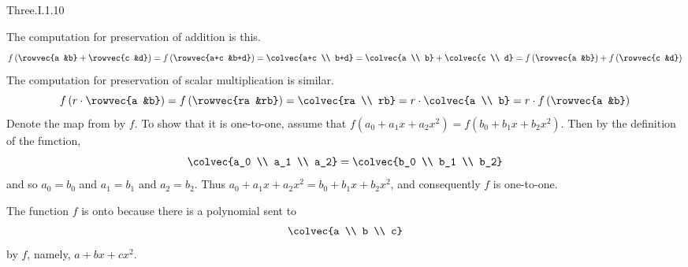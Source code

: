 \begin{ans}{Three.I.1.10}
\begin{exparts}
       The computation for preservation of addition is this.
       \begin{equation*}
         f\left(\rowvec{a &b}+\rowvec{c &d}\right)
           = f\left(\rowvec{a+c &b+d}\right)
           = \colvec{a+c \\ b+d}
           = \colvec{a \\ b}+\colvec{c \\ d}
           = f\left(\rowvec{a &b}\right)+f\left(\rowvec{c &d}\right)
       \end{equation*}
       The computation for preservation of scalar multiplication is similar.
       \begin{equation*}
         f\left(r\cdot\rowvec{a &b}\right)
           = f\left(\rowvec{ra &rb}\right)
           = \colvec{ra \\ rb}
           = r\cdot\colvec{a \\ b}
           = r\cdot f\left(\rowvec{a &b}\right)
       \end{equation*}
     \partsitem Denote the map from  by
      $f$.
      To show that it is one-to-one,
      assume that \( f(a_0+a_1x+a_2x^2)=f(b_0+b_1x+b_2x^2) \).
      Then by the definition of the function,
      \begin{equation*}
        \colvec{a_0 \\ a_1 \\ a_2}
        =\colvec{b_0 \\ b_1 \\ b_2}
      \end{equation*}
      and so \( a_0=b_0 \) and \( a_1=b_1 \) and \( a_2=b_2 \).
      Thus \( a_0+a_1x+a_2x^2=b_0+b_1x+b_2x^2 \), and consequently \( f \)
      is one-to-one.

      The function $f$ is onto because there is a polynomial sent to
      \begin{equation*}
        \colvec{a \\ b \\ c}
      \end{equation*}
      by \( f \), namely, \( a+bx+cx^2 \).


\end{exparts}
\end{ans}
